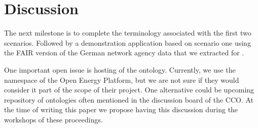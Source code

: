 \section{Discussion}
\label{discussion}


The next milestone is to complete the terminology associated with the first two
scenarios. Followed by a demonstration application based on scenario one using
the FAIR version of the German network agency data that we extracted for
\cite{ArellanoRuiz.2024}.

One important open issue is hosting of the ontology. Currently, we use the
namespace of the Open Energy Platform, but we are not sure if they would
consider it part of the scope of their project. One alternative could be
upcoming repository of ontologies often mentioned in the discussion board of
the CCO. At the time of writing this paper we propose having this discussion
during the workshops of these proceedings.
